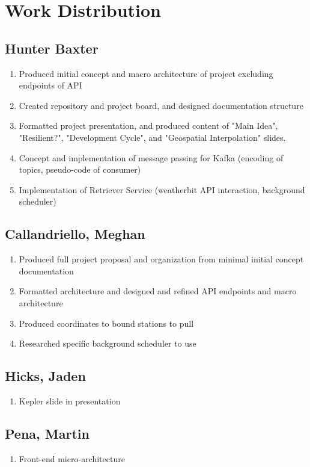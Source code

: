 \section{Work Distribution}
\subsection{Hunter Baxter}
\begin{enumerate}[i]
    \item Produced initial concept and macro architecture of project excluding endpoints of API
    \item Created repository and project board, and designed documentation structure
    \item Formatted project presentation, and produced content of "Main Idea", "Resilient?", "Development Cycle", and "Geospatial Interpolation" slides. 
    \item Concept and implementation of message passing for Kafka (encoding of topics, pseudo-code of consumer)
    \item Implementation of Retriever Service (weatherbit API interaction, background scheduler)
\end{enumerate}

\subsection{Callandriello, Meghan}
\begin{enumerate}[i]
    \item Produced full project proposal and organization from minimal initial concept documentation
    \item Formatted architecture and designed and refined API endpoints and macro architecture
    \item Produced coordinates to bound stations to pull
    \item Researched specific background scheduler to use
\end{enumerate}

\subsection{Hicks, Jaden}
\begin{enumerate}[i]
    \item Kepler slide in presentation
\end{enumerate}

\subsection{Pena, Martin}
\begin{enumerate}[i]
    \item Front-end micro-architecture
\end{enumerate}
